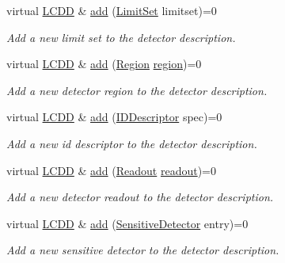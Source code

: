 \begin{DoxyCompactItemize}
virtual \hyperlink{class_d_d4hep_1_1_geometry_1_1_l_c_d_d}{L\+C\+DD} \& \hyperlink{class_d_d4hep_1_1_geometry_1_1_l_c_d_d_a2b6a8c58332d26518c9def51f1acbc0d}{add} (\hyperlink{class_d_d4hep_1_1_geometry_1_1_limit_set}{Limit\+Set} limitset)=0
\begin{DoxyCompactList}\small\item\em Add a new limit set to the detector description. \end{DoxyCompactList}\item 
virtual \hyperlink{class_d_d4hep_1_1_geometry_1_1_l_c_d_d}{L\+C\+DD} \& \hyperlink{class_d_d4hep_1_1_geometry_1_1_l_c_d_d_a618c1268be853682f6da33777aae71a8}{add} (\hyperlink{class_d_d4hep_1_1_geometry_1_1_region}{Region} \hyperlink{class_d_d4hep_1_1_geometry_1_1_l_c_d_d_adbe06759881707fe995472c03810c0ff}{region})=0
\begin{DoxyCompactList}\small\item\em Add a new detector region to the detector description. \end{DoxyCompactList}\item 
virtual \hyperlink{class_d_d4hep_1_1_geometry_1_1_l_c_d_d}{L\+C\+DD} \& \hyperlink{class_d_d4hep_1_1_geometry_1_1_l_c_d_d_a346e521d7e74531597650fa812394e89}{add} (\hyperlink{class_d_d4hep_1_1_geometry_1_1_i_d_descriptor}{I\+D\+Descriptor} spec)=0
\begin{DoxyCompactList}\small\item\em Add a new id descriptor to the detector description. \end{DoxyCompactList}\item 
virtual \hyperlink{class_d_d4hep_1_1_geometry_1_1_l_c_d_d}{L\+C\+DD} \& \hyperlink{class_d_d4hep_1_1_geometry_1_1_l_c_d_d_a68f3490691ccf2937987fbb60969a70d}{add} (\hyperlink{class_d_d4hep_1_1_geometry_1_1_readout}{Readout} \hyperlink{class_d_d4hep_1_1_geometry_1_1_l_c_d_d_aa29f75fba9942edd7f73226a11c9598e}{readout})=0
\begin{DoxyCompactList}\small\item\em Add a new detector readout to the detector description. \end{DoxyCompactList}\item 
virtual \hyperlink{class_d_d4hep_1_1_geometry_1_1_l_c_d_d}{L\+C\+DD} \& \hyperlink{class_d_d4hep_1_1_geometry_1_1_l_c_d_d_a6c10312be5b4fdf8132e25eae6abdac0}{add} (\hyperlink{class_d_d4hep_1_1_geometry_1_1_sensitive_detector}{Sensitive\+Detector} entry)=0
\begin{DoxyCompactList}\small\item\em Add a new sensitive detector to the detector description. \end{DoxyCompactList}\item 

\end{DoxyCompactItemize}
